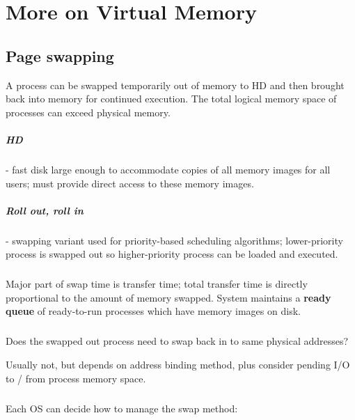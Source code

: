\chapter{More on Virtual Memory}

\section{Page swapping}

A process can be swapped temporarily out of memory to HD and then brought back into memory for continued execution. The total logical memory space of processes can exceed physical memory.

\paragraph{HD} - fast disk large enough to accommodate copies of all
memory images for all users; must provide direct access to these
memory images.

\paragraph{Roll out, roll in} - swapping variant used for priority-based scheduling
algorithms; lower-priority process is swapped out so higher-priority
process can be loaded and executed.

\paragraph{}

Major part of swap time is transfer time; total transfer time is directly
proportional to the amount of memory swapped. System maintains a \textbf{ready queue} of ready-to-run processes which
have memory images on disk.

\paragraph{}
Does the swapped out process need to swap back in to same physical
addresses?

Usually not, but depends on address binding method, plus consider pending I/O to / from process memory space.

\paragraph{}

Each OS can decide how to manage the swap method:

